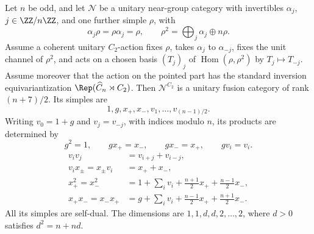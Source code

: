 \begin{proposition}
\label{prop:inversion-model}
Let $n$ be odd, and let $\mathcal N$ be a unitary near-group category with
invertibles $\alpha_j$, $j\in\ZZ/n\ZZ$, and one further simple $\rho$,
with
\[
 \alpha_j\rho=\rho\alpha_j=\rho,\qquad
 \rho^2=\bigoplus_j\alpha_j\oplus n\rho.
\]
Assume a coherent unitary $C_2$-action fixes $\rho$, takes $\alpha_j$ to
$\alpha_{-j}$, fixes the unit channel of $\rho^2$, and acts on a chosen
basis $(T_j)_j$ of $\operatorname{Hom}(\rho,\rho^2)$ by $T_j\mapsto T_{-j}$.
Assume moreover that the action on the pointed part has the standard
inversion equivariantization $\Rep(\widehat C_n\rtimes C_2)$.
Then $\mathcal N^{C_2}$ is a unitary fusion category of rank $(n+7)/2$.
Its simples are
\[
 1,g,x_+,x_-,v_1,\ldots,v_{(n-1)/2}.
\]
Writing $v_0=1+g$ and $v_j=v_{-j}$, with indices modulo $n$, its products
are determined by
\[
 g^2=1,\qquad gx_+=x_-,\qquad gx_-=x_+,\qquad gv_i=v_i.
\]
\begin{align*}
 v_i v_j&=v_{i+j}+v_{i-j},\\
 v_i x_\pm=x_\pm v_i&=x_++x_-,\\
 x_+^2=x_-^2
 &=1+\sum_i v_i+\frac{n+1}{2}x_++\frac{n-1}{2}x_-,\\
 x_+x_-=x_-x_+
 &=g+\sum_i v_i+\frac{n-1}{2}x_++\frac{n+1}{2}x_-.
\end{align*}
All its simples are self-dual. The dimensions are $1,1,d,d,2,\ldots,2$,
where $d>0$ satisfies $d^2=n+nd$.
\end{proposition}
